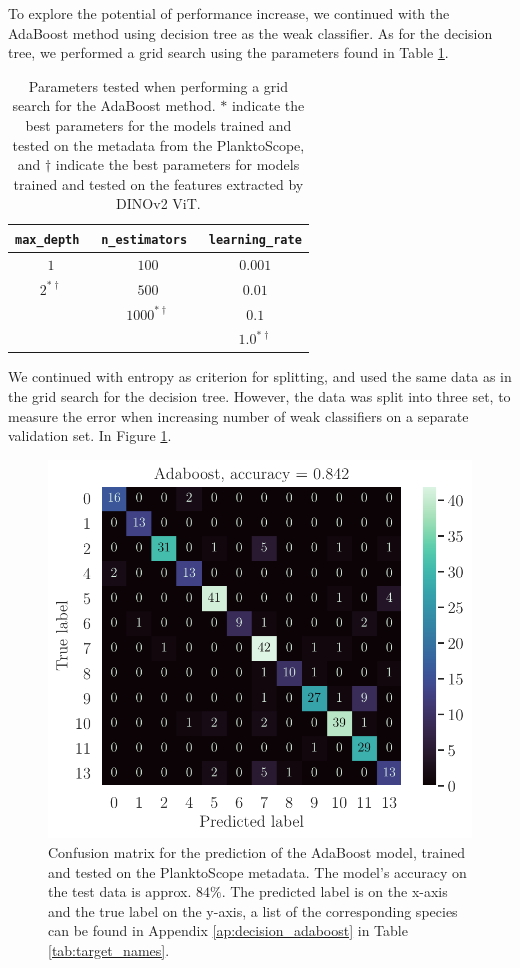 To explore the potential of performance increase, we continued with the AdaBoost method using decision tree as the weak classifier. As for the decision tree, we performed a grid search using the parameters found in Table \ref{tab:params_adaboost}. 
\begin{table}[h]
    \centering
    \begin{tabular}{ccc}
        \hline
        \verb|max_depth| \, & \verb|n_estimators| \, & \verb|learning_rate| \\
        \hline 
        $1$ & $100$ & $0.001$ \\
        $2^{*\dagger}$ & $500$ & $0.01$ \\
         & $1000^{*\dagger}$ & $0.1$ \\
         & & $1.0^{*\dagger}$ \\
        \hline
    \end{tabular}
    \caption{Parameters tested when performing a grid search for the AdaBoost method. $*$ indicate the best parameters for the models trained and tested on the metadata from the PlanktoScope, and $\dagger$ indicate the best parameters for models trained and tested on the features extracted by DINOv2 ViT.}
    \label{tab:params_adaboost}
\end{table}
We continued with entropy as criterion for splitting, and used the same data as in the grid search for the decision tree. However, the data was split into three set, to measure the error when increasing number of weak classifiers on a separate validation set. In Figure \ref{fig:cm_adaboost_metadata}.
\begin{figure}
    \centering
    \includegraphics[width=\linewidth]{latex/figures/cm_adaboost_planktoscope_metadata_labeled.pdf}
    \caption{Confusion matrix for the prediction of the AdaBoost model, trained and tested on the PlanktoScope metadata. The model's accuracy on the test data is approx. $84\%$. The predicted label is on the x-axis and the true label on the y-axis, a list of the corresponding species can be found in Appendix \ref{ap:decision_adaboost} in Table \ref{tab:target_names}.}
    \label{fig:cm_adaboost_metadata}
\end{figure}
